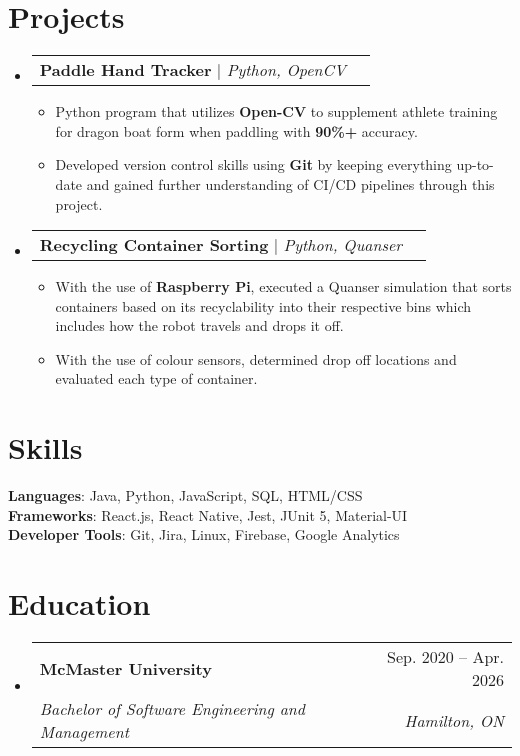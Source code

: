 \documentclass[letterpaper,11pt]{article}
\makeatletter
\newcommand{\resumeItem}[1]{
  \item\small{
    {#1 \vspace{-2pt}}
  }
}
\newcommand{\resumeSubheading}[4]{
  \vspace{-2pt}\item
    \begin{tabular*}{0.97\textwidth}[t]{l@{\extracolsep{\fill}}r}
      \textbf{#1} & #2 \\
      \textit{\small#3} & \textit{\small #4} \\
    \end{tabular*}\vspace{-7pt}
}
\newcommand{\resumeProjectHeading}[2]{
    \item
    \begin{tabular*}{0.97\textwidth}{l@{\extracolsep{\fill}}r}
      \small#1 & #2 \\
    \end{tabular*}\vspace{-7pt}
}
\newcommand{\resumeSubHeadingListStart}{\begin{itemize}[leftmargin=0.15in, label={}]}
\newcommand{\resumeSubHeadingListEnd}{\end{itemize}}
\newcommand{\resumeItemListStart}{\begin{itemize}}
\newcommand{\resumeItemListEnd}{\end{itemize}\vspace{-5pt}}
\makeatother
\begin{document}
\section{Projects}
    \resumeSubHeadingListStart
      \resumeProjectHeading
        {\textbf{Paddle Hand Tracker} $|$ \emph{Python, OpenCV}}{}
        \resumeItemListStart
          \resumeItem{Python program that utilizes \textbf{Open-CV} to supplement athlete training for dragon boat form when paddling with \textbf{90\%+} accuracy.}
          \resumeItem{Developed version control skills using \textbf{Git} by keeping everything up-to-date and gained further understanding of CI/CD pipelines through this project.}
        \resumeItemListEnd
      \resumeProjectHeading
        {\textbf{Recycling Container Sorting} $|$ \emph{Python, Quanser}}{}
        \resumeItemListStart
          \resumeItem{With the use of \textbf{Raspberry Pi}, executed a Quanser simulation that sorts containers based on its recyclability into their respective bins which includes how the robot travels and drops it off.}
          \resumeItem{With the use of colour sensors, determined drop off locations and evaluated each type of container.}
        \resumeItemListEnd
    \resumeSubHeadingListEnd

\section{Skills}
 \begin{itemize}[leftmargin=0.15in, label={}]
    \small{\item{
     \textbf{Languages}{: Java, Python, JavaScript, SQL, HTML/CSS} \\
     \textbf{Frameworks}{: React.js, React Native, Jest, JUnit 5, Material-UI} \\
     \textbf{Developer Tools}{: Git, Jira, Linux, Firebase, Google Analytics} \\
    }}
 \end{itemize}

\section{Education}
  \resumeSubHeadingListStart
    \resumeSubheading
      {McMaster University}{Sep. 2020 -- Apr. 2026}
      {Bachelor of Software Engineering and Management}{Hamilton, ON}
  \resumeSubHeadingListEnd
\end{document}
